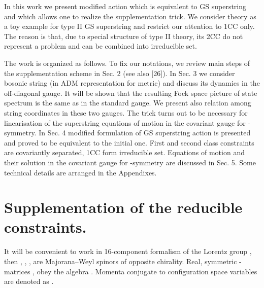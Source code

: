 \documentclass[a4paper]{article}
\begin{document}
In this work we present modified action which is equivalent to \coordHE{} 
GS superstring and which allows one to realize the supplementation 
trick. We consider \coordHE{} theory as a toy example for type II GS 
superstring and restrict our attention to 1CC only. The reason is that, 
due to special structure of type II theory, its 2CC do not represent 
a problem and can be combined into irreducible set.

The work is organized as follows. To fix our notations, we review main 
steps of the supplementation scheme in Sec. 2 (see also [26]). 
In Sec. 3 we consider bosonic string (in ADM representation for \coordHE{} 
metric) and discuss its dynamics in the off-diagonal gauge. It will be 
shown that the resulting Fock space picture of state spectrum is the 
same as in the standard gauge. We present also relation among string 
coordinates in these two gauges. The trick turns out to be necessary 
for linearisation of the superstring equations of motion in the 
covariant gauge for \myHighlight{$\kappa$}\coordHE{}-symmetry. In Sec. 4 modified formulation 
of \coordHE{} GS superstring action is presented and proved to be 
equivalent to the initial one. First and second class constraints are 
covariantly separated, 1CC form irreducible set. Equations of motion 
and their solution in the covariant gauge for \myHighlight{$\kappa$}\coordHE{}-symmetry are 
discussed in Sec. 5. Some technical details are arranged in the 
Appendixes.  

\section{Supplementation of the reducible constraints.} 

It will be convenient to work in 16-component formalism of the Lorentz
group \coordHE{},
then \myHighlight{$\theta^\alpha$}\coordHE{}, \myHighlight{$\psi_\alpha$}\coordHE{}, \coordHE{}, are
Majorana--Weyl spinors of opposite chirality. Real, symmetric
\coordHE{}  \myHighlight{$\Gamma$}\coordHE{}-matrices \myHighlight{${\Gamma^\mu}_{\alpha\beta}$}\coordHE{},
\myHighlight{$\tilde\Gamma^{\mu\alpha\beta}$}\coordHE{} obey the algebra
\myHighlight{$\Gamma^\mu\tilde\Gamma^\nu+\Gamma^\nu\tilde\Gamma^\mu=-2\eta^{\mu\nu},
~ \eta^{\mu\nu}=(+,-, \ldots ,-)$}\coordHE{}.
Momenta conjugate to configuration space variables \coordHE{}
are denoted as \coordHE{}.
\end{document}
